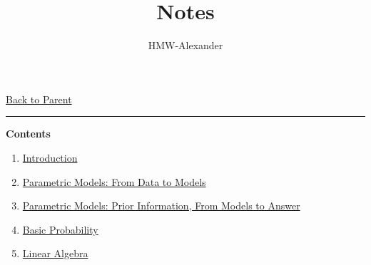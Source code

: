 \documentclass[letterpaper,11pt]{article}
\title{\textbf{Notes}}
\author{HMW-Alexander}
\newcommand{\panhline}{\begin{center}\rule{\textwidth}{1pt}\end{center}}
\begin{document}
\maketitle
\href{../index.html}{Back to Parent}

\panhline
\textbf{Contents}

\begin{enumerate}
	\item \href{./01_Introduction/document.html}{Introduction}
	\item \href{./02_ParametricModels/document.html}{Parametric Models: From Data to Models}
	\item \href{./03_ParametricModels/document.html}{Parametric Models: Prior Information, From Models to Answer}
	\item \href{./R1_BasicProbability/document.html}{Basic Probability}
	\item \href{./R2_LinearAlgebra/document.html}{Linear Algebra}
\end{enumerate}
\end{document}
